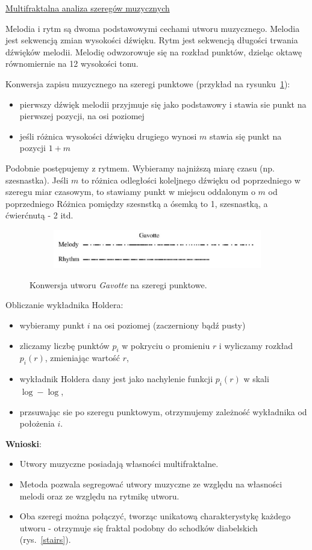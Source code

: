 \underline{Multifraktalna analiza szeregów muzycznych}

Melodia i rytm są dwoma podstawowymi cechami utworu muzycznego. Melodia jest sekwencją zmian wysokości dźwięku. Rytm jest sekwencją długości trwania dźwięków melodii. Melodię odwzorowuje się na rozkład punktów, dzieląc oktawę równomiernie na 12 wysokości tonu.

Konwersja zapisu muzycznego na szeregi punktowe (przykład na rysunku~\ref{gavotte}):
\begin{itemize}
	\item pierwszy dźwięk melodii przyjmuje się jako podstawowy i stawia sie punkt na pierwszej pozycji, na osi poziomej
	\item jeśli różnica wysokości dźwięku drugiego wynosi $ m $ stawia się punkt na pozycji $ 1 + m $
\end{itemize}

Podobnie postępujemy z rytmem. Wybieramy najniższą miarę czasu (np. szesnastka). Jeśli $ m $ to różnica odległości koleljnego dźwięku od poprzedniego w szeregu miar czasowym, to stawiamy punkt w miejscu oddalonym o $ m $ od poprzedniego Różnica pomiędzy szesnstką a ósemką to 1, szesnastką, a ćwierćnutą - 2 itd.

\begin{figure} [H]
	\centering
	\begin{subfigure}{.8\textwidth}
		\centering
		\includegraphics[width=1.0\linewidth]{EDMIIssues/Figures/gavotte.png}
	\end{subfigure}
	\caption{Konwersja utworu \textit{Gavotte} na szeregi punktowe.}
	\label{gavotte}
\end{figure} 

Obliczanie wykładnika Holdera:
\begin{itemize}
	\item wybieramy punkt $ i $ na osi poziomej (zaczerniony bądź pusty)
	\item zliczamy liczbę punktów $ p_i $ w pokryciu o promieniu $ r $ i wyliczamy rozkład $ p_i(r) $, zmieniając wartość $ r $,
	\item wykładnik Holdera dany jest jako nachylenie funkcji $ p_i(r) $ w skali $ \log-\log $,
	\item przsuwając sie po szeregu punktowym, otrzymujemy zależność wykładnika od położenia $ i $.
\end{itemize} 
\textbf{Wnioski}:
\begin{itemize}
	\item Utwory muzyczne posiadają własności multifraktalne.
	\item Metoda pozwala segregować utwory muzyczne ze względu na własności melodi oraz ze względu na rytmikę utworu.
	\item Oba szeregi można połączyć, tworząc unikatową charakterystykę każdego utworu - otrzymuje się fraktal podobny do schodków diabelskich (rys.~\ref{stairs}).
\end{itemize}

